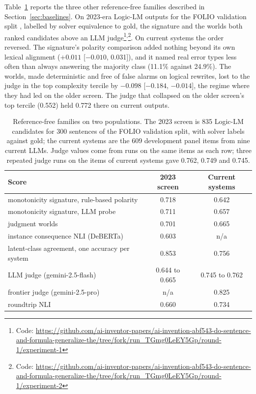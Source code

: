 \documentclass[11pt,letterpaper]{article}
\begin{document}
Table~\ref{tab:families} reports the three other reference-free families described in Section~\ref{sec:baselines}. On 2023-era Logic-LM outputs for the FOLIO validation split \citep{Pan2023}, labelled by solver equivalence to gold, the signature and the worlds both ranked candidates above an LLM judge\footnote{Code: \url{https://github.com/ai-inventor-papers/ai-invention-abf543-do-sentence-and-formula-generalize-the/tree/fork/run_TGmg0LeEY5Gp/round-1/experiment-1}}\textsuperscript{,}\footnote{Code: \url{https://github.com/ai-inventor-papers/ai-invention-abf543-do-sentence-and-formula-generalize-the/tree/fork/run_TGmg0LeEY5Gp/round-1/experiment-2}}. On current systems the order reversed. The signature's polarity comparison added nothing beyond its own lexical alignment ($+0.011$ [$-0.010$, 0.031]), and it named real error types less often than always answering the majority class (11.1\% against 24.9\%). The worlds, made deterministic and free of false alarms on logical rewrites, lost to the judge in the top complexity tercile by $-0.098$ [$-0.184$, $-0.014$], the regime where they had led on the older screen. The judge that collapsed on the older screen's top tercile (0.552) held 0.772 there on current outputs.

\begin{table}[!htbp]
  \centering
  \small
  \caption{Reference-free families on two populations. The 2023 screen is 835 Logic-LM candidates for 300 sentences of the FOLIO validation split, with solver labels against gold; the current systems are the 609 development panel items from nine current LLMs. Judge values come from runs on the same items as each row; three repeated judge runs on the items of current systems gave 0.762, 0.749 and 0.745.}
  \label{tab:families}
  \begin{tabular}{lcc}
    \toprule
    Score & 2023 screen & Current systems \\
    \midrule
    monotonicity signature, rule-based polarity & 0.718 & 0.642 \\
    monotonicity signature, LLM probe & 0.711 & 0.657 \\
    judgment worlds & 0.701 & 0.665 \\
    instance consequence NLI (DeBERTa) & 0.603 & n/a \\
    latent-class agreement, one accuracy per system & 0.853 & 0.756 \\
    LLM judge (gemini-2.5-flash) & 0.644 to 0.665 & 0.745 to 0.762 \\
    frontier judge (gemini-2.5-pro) & n/a & 0.825 \\
    roundtrip NLI & 0.660 & 0.734 \\
    \bottomrule
  \end{tabular}
\end{table}
\end{document}
